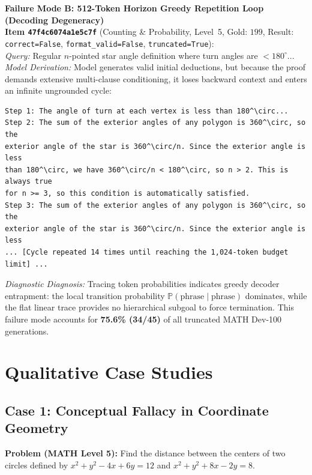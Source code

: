 \documentclass[11pt,a4paper]{article}
\begin{document}
\begin{tcolorbox}[colback=blue!3,colframe=blue!60!black,title={\textbf{Qualitative Case Study: The Two Failure Modes of Flat \texttt{Step}/\texttt{Calc} Traces on MATH Dev-100}}]
\textbf{Failure Mode B: 512-Token Horizon Greedy Repetition Loop (Decoding Degeneracy)}\\
\textbf{Item \texttt{47f4c6074a1e5c7f}} (Counting \& Probability, Level~5, Gold: $199$, Result: \texttt{correct=False}, \texttt{format\_valid=False}, \texttt{truncated=True}):\\
\textit{Query:} Regular $n$-pointed star angle definition where turn angles are $< 180^\circ$...\\
\textit{Model Derivation:} Model generates valid initial deductions, but because the proof demands extensive multi-clause conditioning, it loses backward context and enters an infinite ungrounded cycle:
\begin{lstlisting}[basicstyle=\ttfamily\scriptsize]
Step 1: The angle of turn at each vertex is less than 180^\circ...
Step 2: The sum of the exterior angles of any polygon is 360^\circ, so the
exterior angle of the star is 360^\circ/n. Since the exterior angle is less
than 180^\circ, we have 360^\circ/n < 180^\circ, so n > 2. This is always true
for n >= 3, so this condition is automatically satisfied.
Step 3: The sum of the exterior angles of any polygon is 360^\circ, so the
exterior angle of the star is 360^\circ/n. Since the exterior angle is less
... [Cycle repeated 14 times until reaching the 1,024-token budget limit] ...
\end{lstlisting}
\textit{Diagnostic Diagnosis:} Tracing token probabilities indicates greedy decoder entrapment: the local transition probability $\mathbb{P}(\text{phrase} \mid \text{phrase})$ dominates, while the flat linear trace provides no hierarchical subgoal to force termination. This failure mode accounts for \textbf{75.6\% (34/45)} of all truncated MATH Dev-100 generations.
\end{tcolorbox}

\section{Qualitative Case Studies}

\subsection{Case 1: Conceptual Fallacy in Coordinate Geometry}
\textbf{Problem (MATH Level 5):} Find the distance between the centers of two circles defined by $x^2 + y^2 - 4x + 6y = 12$ and $x^2 + y^2 + 8x - 2y = 8$.
\end{document}
